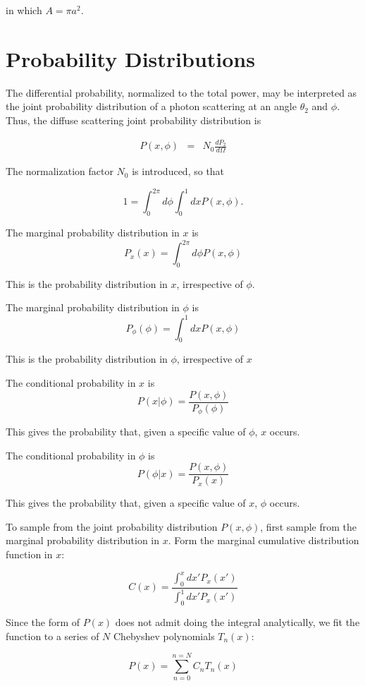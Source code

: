 \documentclass[11pt,openany]{report}
\newcommand{\der}[2]{\frac{d {#1}}{d {#2}}}
\begin{document}
{{ in which $A=\pi a^{2}.$

\section{Probability Distributions}

The differential probability, normalized to the total power, may be interpreted as the joint probability distribution of a photon scattering at an angle $\theta_{2}$ and $\phi$.  Thus, the diffuse scattering joint probability distribution is

\begin{eqnarray}
P(x,\phi)&=&N_{0}\der{P_{2}}{\Omega}\end{eqnarray}

The normalization factor $N_{0}$ is introduced, so that

$$1=\int_{0}^{2\pi}d\phi\int_{0}^{1}dxP(x,\phi).$$


The marginal probability distribution in $x$ is
$$P_{x}(x)=\int_{0}^{2\pi}d\phi P(x,\phi)$$

This is the probability distribution in $x$, irrespective of $\phi.$

The marginal probability distribution in $\phi$ is
$$P_{\phi}(\phi)=\int_{0}^{1}dxP(x,\phi)$$

This is the probability distribution in $\phi$, irrespective of $x$

The conditional probability in $x$ is 
$$P(x|\phi)=\frac{P(x,\phi)}{P_{\phi}(\phi)}$$

This gives the probability that, given a specific value of $\phi$, $x$ occurs. 

The conditional probability in $\phi$ is 
$$P(\phi|x)=\frac{P(x,\phi)}{P_{x}(x)}$$

This gives the probability that, given a specific value of $x$, $\phi$ occurs. 


To sample from the joint probability distribution $P(x,\phi)$, first
sample from the marginal probability distribution in $x$. Form the
marginal cumulative distribution function in $x$:

$$C(x)=\frac{\int_{0}^{x}dx'P_{x}(x')}{\int_{0}^{1}dx'P_{x}(x')}$$

Since the form of $P(x)$ does not admit doing the integral
analytically, we fit the function to a series of $N$ Chebyshev
polynomials $T_{n}(x)$:

$$P(x)=\sum_{n=0}^{n=N}C_{n}T_{n}(x)$$

}}
\end{document}
